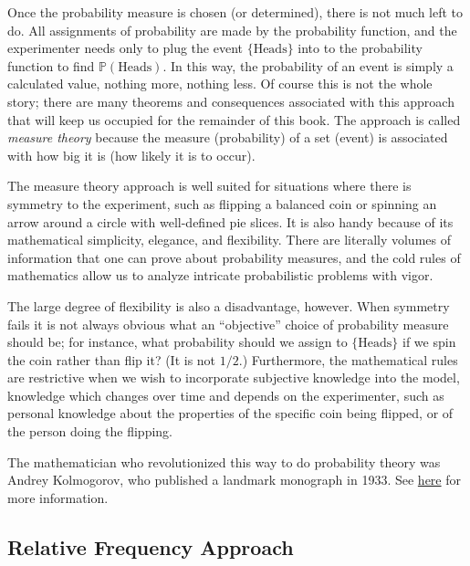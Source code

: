 \documentclass[captions=tableheading]{scrbook}
\begin{document}
Once the probability measure is chosen (or determined), there is not much left to do. All assignments of probability are made by the probability function, and the experimenter needs only to plug the event \(\{ \mbox{Heads} \}\) into to the probability function to find \(\mathbb{P}(\mbox{Heads})\). In this way, the probability of an event is simply a calculated value, nothing more, nothing less. Of course this is not the whole story; there are many theorems and consequences associated with this approach that will keep us occupied for the remainder of this book. The approach is called \emph{measure theory} because the measure (probability) of a set (event) is associated with how big it is (how likely it is to occur).

The measure theory approach is well suited for situations where there is symmetry to the experiment, such as flipping a balanced coin or spinning an arrow around a circle with well-defined pie slices. It is also handy because of its mathematical simplicity, elegance, and flexibility. There are literally volumes of information that one can prove about probability measures, and the cold rules of mathematics allow us to analyze intricate probabilistic problems with vigor. 

The large degree of flexibility is also a disadvantage, however. When symmetry fails it is not always obvious what an ``objective'' choice of probability measure should be; for instance, what probability should we assign to \( \{ \mbox{Heads} \} \) if we spin the coin rather than flip it? (It is not \(1/2\).) Furthermore, the mathematical rules are restrictive when we wish to incorporate subjective knowledge into the model, knowledge which changes over time and depends on the experimenter, such as personal knowledge about the properties of the specific coin being flipped, or of the person doing the flipping.

The mathematician who revolutionized this way to do probability theory was Andrey Kolmogorov, who published a landmark monograph in 1933. See \href{http://www-history.mcs.st-andrews.ac.uk/Mathematicians/Kolmogorov.html}{here} for more information.
\subsection{Relative Frequency Approach}
\label{sec-4-3-2}
\end{document}
